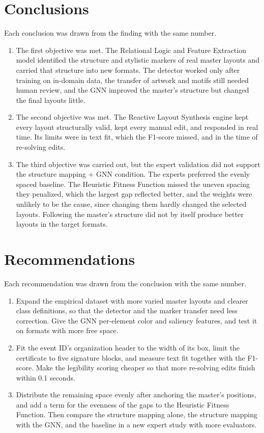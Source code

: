 \begin{refsection}
\section{Conclusions}

Each conclusion was drawn from the finding with the same number.

\begin{enumerate}
    \item The first objective was met. The Relational Logic and Feature Extraction model identified the structure and stylistic markers of real master layouts and carried that structure into new formats. The detector worked only after training on in-domain data, the transfer of artwork and motifs still needed human review, and the GNN improved the master's structure but changed the final layouts little.
    \item The second objective was met. The Reactive Layout Synthesis engine kept every layout structurally valid, kept every manual edit, and responded in real time. Its limits were in text fit, which the F1-score missed, and in the time of re-solving edits.
    \item The third objective was carried out, but the expert validation did not support the structure mapping + GNN condition. The experts preferred the evenly spaced baseline. The Heuristic Fitness Function missed the uneven spacing they penalized, which the largest gap reflected better, and the weights were unlikely to be the cause, since changing them hardly changed the selected layouts. Following the master's structure did not by itself produce better layouts in the target formats.
\end{enumerate}

\section{Recommendations}

Each recommendation was drawn from the conclusion with the same number.

\begin{enumerate}
    \item Expand the empirical dataset with more varied master layouts and clearer class definitions, so that the detector and the marker transfer need less correction. Give the GNN per-element color and saliency features, and test it on formats with more free space.
    \item Fit the event ID's organization header to the width of its box, limit the certificate to five signature blocks, and measure text fit together with the F1-score. Make the legibility scoring cheaper so that more re-solving edits finish within 0.1 seconds.
    \item Distribute the remaining space evenly after anchoring the master's positions, and add a term for the evenness of the gaps to the Heuristic Fitness Function. Then compare the structure mapping alone, the structure mapping with the GNN, and the baseline in a new expert study with more evaluators.
\end{enumerate}

\clearpage
\end{refsection}
